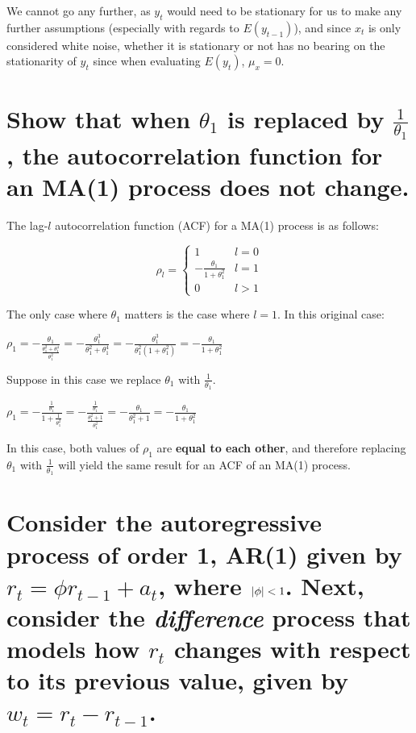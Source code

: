 \documentclass{article}
\begin{document}
\par\noindent\Large We cannot go any further, as $y_{t}$ would need to be stationary for us to make any further assumptions (especially with regards to $E(y_{t - 1})$), and since $x_{t}$ is only considered white noise, whether it is stationary or not has no bearing on the stationarity of $y_{t}$ since when evaluating $E(y_{t})$, $\mu_{x} = 0$.

\section{Show that when $\theta_{1}$ is replaced by $\frac{1}{\theta_{1}}$, the autocorrelation function for an MA(1) process does not change.}

\par\noindent\Large The lag-$l$ autocorrelation function (ACF) for a MA(1) process is as follows:

\[\rho_{l} = \begin{cases} 
      1 & l = 0 \\
      -\frac{\theta_{1}}{1 + \theta_{1}^{2}} & l = 1 \\
      0 & l > 1 
   \end{cases}
\]
\par\noindent\Large The only case where $\theta_{1}$ matters is the case where $l = 1$.  In this original case:
\par\noindent\huge $\rho_{1} = -\frac{\theta_{1}}{\frac{\theta_{1}^{2}+\theta_{1}^{4}}{\theta_{1}^{2}}} = -\frac{\theta_{1}^{3}}{\theta_{1}^{2} + \theta_{1}^{4}} = -\frac{\theta_{1}^{3}}{\theta_{1}^{2}(1 + \theta_{1}^{2})} = -\frac{\theta_{1}}{1 + \theta_{1}^{2}}$

\par\noindent\Large Suppose in this case we replace $\theta_{1}$ with $\frac{1}{\theta_{1}}$. 
\par\noindent\huge$\rho_{1} = -\frac{\frac{1}{\theta_{1}}}{1 + \frac{1}{\theta_{1}^{2}}} = -\frac{\frac{1}{\theta_{1}}}{\frac{\theta_{1}^{2} + 1}{\theta_{1}^{2}}} = -\frac{\theta_{1}}{\theta_{1}^{2} + 1} = -\frac{\theta_{1}}{1 + \theta_{1}^{2}}$

\par\noindent\Large In this case, both values of $\rho_{1}$ are \textbf{equal to each other}, and therefore replacing $\theta_{1}$ with $\frac{1}{\theta_{1}}$ will yield the same result for an ACF of an MA(1) process.

\section{Consider the autoregressive process of order 1, AR(1) given by $r_{t} = \phi r_{t - 1} + a_{t}$, where $\abs{\phi} < 1$.  Next, consider the \textit{difference} process that models how $r_{t}$ changes with respect to its previous value, given by $w_{t} = r_{t} - r_{t - 1}$.}
\end{document}
